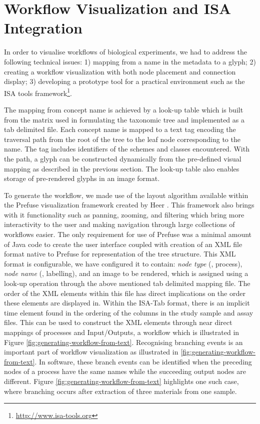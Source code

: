 \section{Workflow Visualization and ISA Integration}
\label{sec:Workflow}

In order to visualise workflows of biological experiments, we had to address the following technical issues:
1) mapping from a name in the metadata to a glyph;
2) creating a workflow visualization with both node placement and connection display;
3) developing a prototype tool for a practical environment such as the ISA tools framework\footnote{\url{http://www.isa-tools.org}}.

The mapping from concept name is achieved by a look-up table which is built from the matrix used in formulating the taxonomic tree and implemented as a tab delimited file.
Each concept name is mapped to a text tag encoding the traversal path from the root of the tree to the leaf node corresponding to the name.
The tag includes identifiers of the schemes and classes encountered.
With the path, a glyph can be constructed dynamically from the pre-defined visual mapping as described in the previous section.
The look-up table also enables storage of pre-rendered glyphs in an image format.

To generate the workflow, we made use of the layout algorithm available within the Prefuse visualization framework created by Heer \etal \cite{heer05}.
This framework also brings with it functionality such as panning, zooming, and filtering which bring more interactivity to the user and making navigation through large collections of workflows easier. 
The only requirement for use of Prefuse was a minimal amount of Java code to create the user interface coupled with creation of an XML file format native to Prefuse for representation of the tree structure.
This XML format is configurable, we have configured it to contain: \emph{node type} (\eg, process), \emph{node name} (\eg, labelling), and an image to be rendered, which is assigned using a look-up operation through the above mentioned tab delimited mapping file. 
The order of the XML elements within this file has direct implications on the order these elements are displayed in. 
Within the ISA-Tab format, there is an implicit time element found in the ordering of the columns in the study sample and assay files. 
This can be used to construct the XML elements through near direct mappings of processes and Input/Outputs, a workflow which is illustrated in Figure \ref{fig:generating-workflow-from-text}. 
Recognising branching events is an important part of workflow visualization as illustrated in \ref{fig:generating-workflow-from-text}. 
In software, these branch events can be identified when the preceding nodes of a process have the same names while the succeeding output nodes are different. 
Figure \ref{fig:generating-workflow-from-text} highlights one such case, where branching occurs after extraction of three materials from one sample. 

